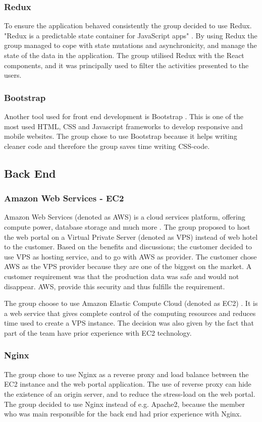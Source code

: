 \subsubsection{Redux}
\label{redux}
To ensure the application behaved consistently the group decided to use Redux. "Redux is a predictable state container for JavaScript apps" \cite{Redux}. By using Redux the group managed to cope with state mutations and asynchronicity, and manage the state of the data in the application. The group utilised Redux with the React components, and it was principally used to filter the activities presented to the users.  

\subsubsection{Bootstrap}
Another tool used for front end development is Bootstrap \cite{Bootstrap}. This is one of the most used HTML, CSS and Javascript frameworks to develop responsive and mobile websites. The group chose to use Bootstrap because it helps writing cleaner code and therefore the group  saves time writing CSS-code. 

\subsection{Back End}
\subsubsection{Amazon Web Services - EC2}
Amazon Web Services (denoted as AWS) is a cloud services platform, offering compute power, database storage and much more \cite{AWS}. The group proposed to host the web portal on a Virtual Private Server (denoted as VPS) instead of web hotel to the customer. Based on the benefits and discussions; the customer decided to use VPS as hosting service, and to go with AWS as provider. The customer chose AWS as the VPS provider because they are one of the biggest on the market. A customer requirement was that the production data was safe and would not disappear. AWS, provide this security and thus fulfills the requirement.

The group choose to use Amazon Elastic Compute Cloud (denoted as EC2) \cite{EC2}. It is a web service that gives complete control of the computing resources and reduces time used to create a VPS instance. The decision was also given by the fact that part of the team have prior experience with EC2 technology. 


\subsubsection{Nginx}
The group chose to use Nginx \cite{nginx} as a reverse proxy and load balance between the EC2 instance and the web portal application. The use of reverse proxy can hide the existence of an origin server, and to reduce the stress-load on the web portal. The group decided to use Nginx instead of e.g. Apache2, because the member who was main responsible for the back end had prior experience with Nginx.


